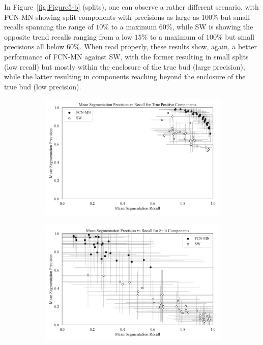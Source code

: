 \documentclass[a4paper,authoryear,review]{elsarticle}
\begin{document}
In Figure~\ref{fig:Figure5-b} (splits), one can observe a rather different scenario, with FCN-MN showing split components with precisions as large as $100\%$ but small recalls spanning the range of $10\%$ to a maximum $60\%$, while SW is showing the opposite trend recalls ranging from a low $15\%$ to a maximum of $100\%$ but small precisions all below $60\%$. When read properly, these results show, again, a better performance of FCN-MN against SW, with the former resulting in small splits (low recall) but mostly within the enclosure of the true bud (large precision), while the latter resulting in components reaching beyond the enclosure of the true bud (low precision).

\begin{figure}%
  \centering
  \begin{subfigure}[b]{0.97\textwidth}
       \centering
       \includegraphics[width=\textwidth]{Figure5-a.png}
       \caption{}
       \label{fig:Figure5-a}
  \end{subfigure}
  \hfill
  \begin{subfigure}[b]{0.97\textwidth}
       \centering
       \includegraphics[width=\textwidth]{Figure5-b.png}

\end{subfigure}
\end{figure}
\end{document}
